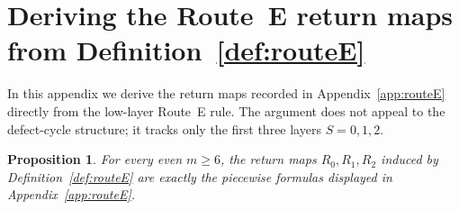 \documentclass[11pt]{article}
\newtheorem{proposition}{Proposition}
\begin{document}
\section{Deriving the Route~E return maps from Definition~\ref{def:routeE}}\label{app:routeE-derivation}

In this appendix we derive the return maps recorded in Appendix~\ref{app:routeE} directly from the low-layer Route~E rule.
The argument does not appeal to the defect-cycle structure; it tracks only the first three layers $S=0,1,2$.

\begin{proposition}\label{prop:routeE-return-formulas}
For every even $m\ge 6$, the return maps $R_0,R_1,R_2$ induced by Definition~\ref{def:routeE} are exactly the piecewise formulas displayed in Appendix~\ref{app:routeE}.
\end{proposition}
\end{document}
